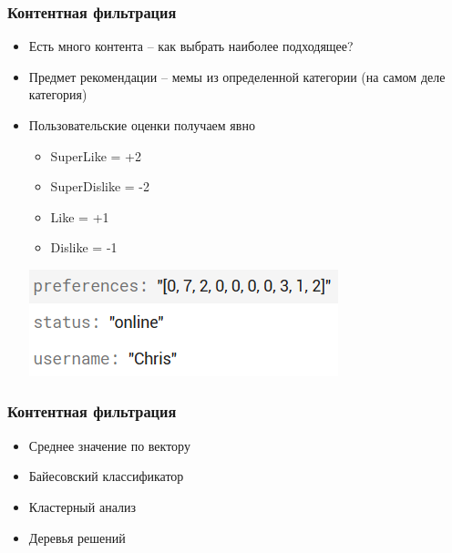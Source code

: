 \documentclass[xetex,mathserif,serif, xcolor=table]{beamer}
\begin{document}
	\begin{frame}
		\frametitle{Контентная фильтрация}
			\begin{itemize}
		    	\item Есть много контента – как выбрать наиболее подходящее?
		    	\item Предмет рекомендации – мемы из определенной категории (на самом деле категория)
		    	\item Пользовательские оценки получаем явно
		    	    \begin{itemize}
        		    	\item SuperLike = +2
        		    	\item SuperDislike = -2
        		    	\item Like = +1
        		    	\item Dislike = -1
        		    	\newline 
			        \end{itemize}
			      \includegraphics[scale=0.8]{images/user.png}   
			\end{itemize}
	\end{frame}
	
	
	\begin{frame}
	\frametitle{Контентная фильтрация}
        \begin{itemize}
            \item Среднее значение по вектору
            \item Байесовский классификатор
            \item Кластерный анализ
            \item Деревья решений
        \end{itemize}
	\end{frame}	
	
\end{document}
